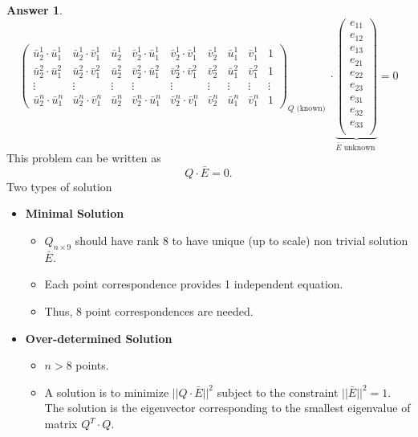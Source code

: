 \documentclass[a4paper,12 pt]{article}
\theoremstyle{definition}
\theoremstyle{remark}
\theoremstyle{definition}
\theoremstyle{definition}
\theoremstyle{definition}
\theoremstyle{definition}
\theoremstyle{remark}
\theoremstyle{remark}
\theoremstyle{definition}
\theoremstyle{definition}
\newtheorem*{answer}{Answer}
\begin{document}
\begin{enumerate}
\begin{answer}
\begin{equation}
{\begin{pmatrix}
\bar{u}_2^1\cdot \bar{u}_1^1&\bar{u}_2^1\cdot \bar{v}_1^1&\bar{u}_2^1&\bar{v}_2^1\cdot \bar{u}_1^1&\bar{v}_2^1\cdot \bar{v}_1^1&\bar{v}_2^1&\bar{u}_1^1&\bar{v}_1^1&1\\
\bar{u}_2^2\cdot \bar{u}_1^2&\bar{u}_2^2\cdot \bar{v}_1^2&\bar{u}_2^2&\bar{v}_2^2\cdot \bar{u}_1^2&\bar{v}_2^2\cdot \bar{v}_1^2&\bar{v}_2^2&\bar{u}_1^2&\bar{v}_1^2&1\\
\vdots &\vdots &\vdots &\vdots &\vdots &\vdots &\vdots &\vdots &\vdots \\
\bar{u}_2^n\cdot \bar{u}_1^n&\bar{u}_2^n\cdot \bar{v}_1^n&\bar{u}_2^n&\bar{v}_2^n\cdot \bar{u}_1^n&\bar{v}_2^n\cdot \bar{v}_1^n&\bar{v}_2^n&\bar{u}_1^n&\bar{v}_1^n&1
\end{pmatrix}}_{Q \text{ (known) }}\cdot  \underbrace{\begin{pmatrix}
e_{11}\\
e_{12}\\
e_{13}\\
e_{21}\\
e_{22}\\
e_{23}\\
e_{31}\\
e_{32}\\
e_{33}\\
 \end{pmatrix}}_{\bar{E} \text{ unknown }}=0
\end{equation}
This problem can be written as
\begin{equation}
Q\cdot \bar{E}=0.
\end{equation}
Two types of solution
\begin{itemize}
\item \textbf{Minimal Solution}
\begin{itemize}
\item $Q_{n\times 9}$ should have rank $8$ to have unique (up to scale) non trivial solution $\bar{E}$.
\item Each point correspondence provides 1 independent equation.
\item Thus, 8 point correspondences are needed.
\end{itemize}
\item \textbf{Over-determined Solution}
\begin{itemize}
\item $n>8$ points.
\item A solution is to minimize $||Q\cdot \bar{E}||^2$ subject to the constraint $||\bar{E}||^2=1$. The solution is the eigenvector corresponding to the smallest eigenvalue of matrix $Q^T\cdot Q$.

\end{itemize}
\end{itemize}
\end{answer}
\end{enumerate}
\end{document}

